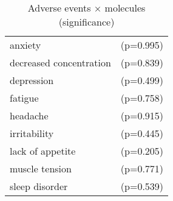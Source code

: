 \begin{table}[!h]
\centering
\caption{Adverse events × molecules (significance)}
\centering
\begin{tabular}[t]{ll}
\toprule
anxiety & (p=0.995)\\
decreased concentration & (p=0.839)\\
depression & (p=0.499)\\
fatigue & (p=0.758)\\
headache & (p=0.915)\\
\addlinespace
irritability & (p=0.445)\\
lack of appetite & (p=0.205)\\
muscle tension & (p=0.771)\\
sleep disorder & (p=0.539)\\
\bottomrule
\end{tabular}
\end{table}
